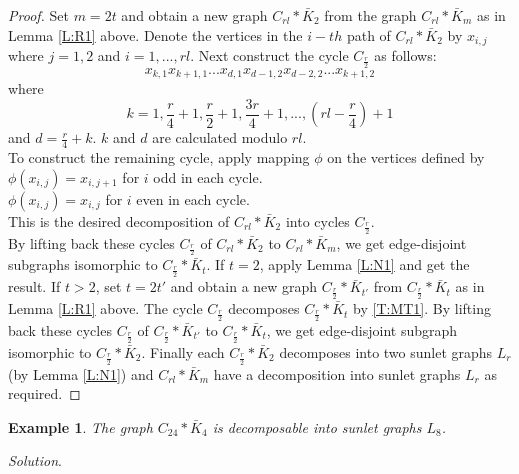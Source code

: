 \documentclass[12pt]{report}
\newtheorem{exm}[thm]{Example}
\begin{document}
\begin{proof}
 Set $m=2t$ and obtain a new graph $C_{rl}*\bar{K}_2$ from the graph $C_{rl}*\bar{K}_m$ as in Lemma \ref{L:R1} above. Denote the vertices in the $i-th$ path of $C_{rl}*\bar{K}_2$ by $x_{i,j}$ where $j=1,2$ and $i=1,...,rl$. Next construct the cycle $C_{\frac{r}{2}}$ as follows:
 $$x_{k,1}x_{k+1,1}...x_{d,1}x_{d-1,2}x_{d-2,2}...x_{k+1,2}$$
 where $$k=1,\frac{r}{4}+1,\frac{r}{2}+1,\frac{3r}{4}+1,...,(rl-\frac{r}{4})+1$$ and $d=\frac{r}{4}+k$. $k$ and $d$ are calculated modulo $rl$.\\
 To construct the remaining cycle, apply mapping $\phi$ on the vertices defined by\\
 $\phi(x_{i,j})=x_{i,j+1}$ for $i$ odd  in each cycle.\\
 $\phi(x_{i,j})=x_{i,j}$ for $i$ even in each cycle.\\
  This is the desired decomposition of $C_{rl}*\bar{K}_2$ into cycles $C_{\frac{r}{2}}$.\\
 By lifting back these cycles $C_\frac{r}{2}$ of $C_{rl}*\bar{K}_2$ to $C_{rl}*\bar{K}_{m}$, we get edge-disjoint subgraphs isomorphic to $C_{\frac{r}{2}}*\bar{K}_t$.
If $t=2$, apply Lemma \ref{L:N1} and get the result. If $t>2$, %
 set $t=2t'$ and obtain a new graph $C_{\frac{r}{2}}*\bar{K}_{t'}$
from $C_{\frac{r}{2}}*\bar{K}_t$ as in Lemma \ref{L:R1} above. The
cycle $C_{\frac{r}{2}}$ decomposes $C_{\frac{r}{2}}*\bar{K}_t$ by
\ref{T:MT1}. By lifting back these cycles $C_{\frac{r}{2}}$ of
$C_{\frac{r}{2}}*\bar{K}_{t'}$ to $C_{\frac{r}{2}}*\bar{K}_t$, we
get edge-disjoint subgraph isomorphic to
$C_{\frac{r}{2}}*\bar{K}_2$. Finally each
$C_{\frac{r}{2}}*\bar{K}_2$  decomposes into two sunlet graphs $L_r$
(by Lemma \ref{L:N1}) and  $C_{rl}*\bar{K}_m$ have a decomposition
into sunlet graphs $L_r$ as required.
\end{proof}
\begin{exm}
The graph $C_{24}*\bar{K}_4$ is decomposable into sunlet graphs
$L_8$.
\end{exm}
{\em Solution}.
\end{document}
